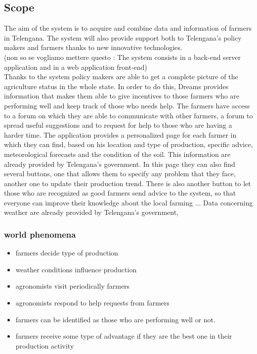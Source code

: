 \documentclass{article}
\begin{document}
\subsection{Scope}
The aim of the system is to acquire and combine data and 
information of farmers in Telengana. 
The system will also provide support both to Telengana's 
policy makers and farmers thanks to 
new innovative technologies.
\\
(non so se vogliamo mettere questo : The system consists in a back-end server application and in a web application front-end)
\\
Thanks to the system policy makers are able to get a complete picture of the agriculture status in the whole state.
    In order to do this,  Dreams provides information that makes them able to give incentives to those farmers who are performing well and keep track of those who needs help.
    The farmers have access to a forum on which they are able to communicate with other farmers, a forum to spread useful suggestions and to request for help to those who are having a harder time.
    The application provides a personalized page for each farmer in which they can find, based on his location and type of production, specific advice, meteorological forecasts and the condition of the soil.
    This information are already provided by Telengana's government.
    In this page they can also find several buttons, one that allows them to specify any problem that they face,
    another one to update their production trend. There is also another button to let those who are recognized as good farmers send advice to the system, so that everyone can improve their knowledge about the local farming ...
    Data concerning weather are already provided by Telengana's government,

\subsubsection{world phenomena}
\begin{itemize}
    \item farmers decide type of production
    \item weather conditions influence production
    \item agronomists visit periodically farmers
    \item agronomists respond to help requests from farmers
    \item farmers can be identified as those who are performing well or not.
    \item farmers receive some type of advantage if they are the best one in their production activity
\end{itemize}
\end{document}
